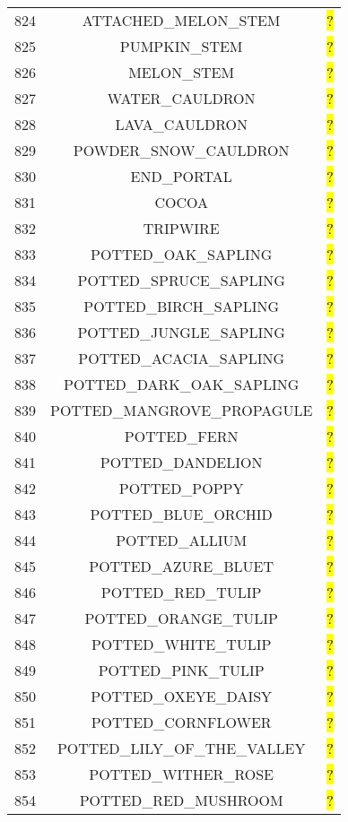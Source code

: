 \documentclass[11pt]{article}
\newcommand\myworries[1]{\sethlcolor{red}\hl{#1}}
\begin{document}
\begin{longtable}{ |c|c|c| }
	824 & ATTACHED\_MELON\_STEM & \myworries{?} \\
	825 & PUMPKIN\_STEM & \myworries{?} \\
	826 & MELON\_STEM & \myworries{?} \\
	827 & WATER\_CAULDRON & \myworries{?} \\
	828 & LAVA\_CAULDRON & \myworries{?} \\
	829 & POWDER\_SNOW\_CAULDRON & \myworries{?} \\
	830 & END\_PORTAL & \myworries{?} \\
	831 & COCOA & \myworries{?} \\
	832 & TRIPWIRE & \myworries{?} \\
	833 & POTTED\_OAK\_SAPLING & \myworries{?} \\
	834 & POTTED\_SPRUCE\_SAPLING & \myworries{?} \\
	835 & POTTED\_BIRCH\_SAPLING & \myworries{?} \\
	836 & POTTED\_JUNGLE\_SAPLING & \myworries{?} \\
	837 & POTTED\_ACACIA\_SAPLING & \myworries{?} \\
	838 & POTTED\_DARK\_OAK\_SAPLING & \myworries{?} \\
	839 & POTTED\_MANGROVE\_PROPAGULE & \myworries{?} \\
	840 & POTTED\_FERN & \myworries{?} \\
	841 & POTTED\_DANDELION & \myworries{?} \\
	842 & POTTED\_POPPY & \myworries{?} \\
	843 & POTTED\_BLUE\_ORCHID & \myworries{?} \\
	844 & POTTED\_ALLIUM & \myworries{?} \\
	845 & POTTED\_AZURE\_BLUET & \myworries{?} \\
	846 & POTTED\_RED\_TULIP & \myworries{?} \\
	847 & POTTED\_ORANGE\_TULIP & \myworries{?} \\
	848 & POTTED\_WHITE\_TULIP & \myworries{?} \\
	849 & POTTED\_PINK\_TULIP & \myworries{?} \\
	850 & POTTED\_OXEYE\_DAISY & \myworries{?} \\
	851 & POTTED\_CORNFLOWER & \myworries{?} \\
	852 & POTTED\_LILY\_OF\_THE\_VALLEY & \myworries{?} \\
	853 & POTTED\_WITHER\_ROSE & \myworries{?} \\
	854 & POTTED\_RED\_MUSHROOM & \myworries{?} \\

\end{longtable}
\end{document}

